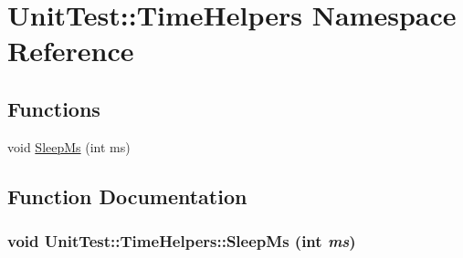 \hypertarget{namespace_unit_test_1_1_time_helpers}{
\section{UnitTest::TimeHelpers Namespace Reference}
\label{namespace_unit_test_1_1_time_helpers}
}
\subsection*{Functions}
\begin{CompactItemize}
\item 
void \hyperlink{namespace_unit_test_1_1_time_helpers_ff0ee0022f768dcab3b0128a65ce8e5a}{SleepMs} (int ms)
\end{CompactItemize}


\subsection{Function Documentation}
\hypertarget{namespace_unit_test_1_1_time_helpers_ff0ee0022f768dcab3b0128a65ce8e5a}{
\subsubsection[{SleepMs}]{\setlength{\rightskip}{0pt plus 5cm}void UnitTest::TimeHelpers::SleepMs (int {\em ms})}}
\label{namespace_unit_test_1_1_time_helpers_ff0ee0022f768dcab3b0128a65ce8e5a}


